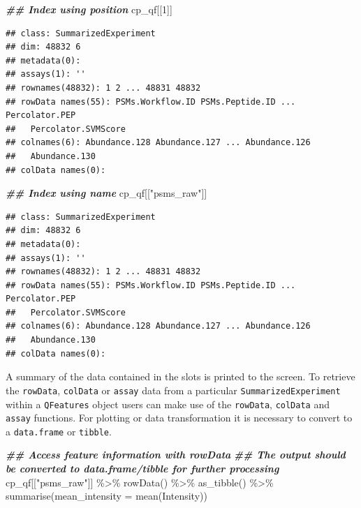 \documentclass[9pt,a4paper,]{extarticle}
\newenvironment{Shaded}{\begin{snugshade}}{\end{snugshade}}
\newcommand{\AttributeTok}[1]{\textcolor[rgb]{0.77,0.63,0.00}{#1}}
\newcommand{\DecValTok}[1]{\textcolor[rgb]{0.00,0.00,0.81}{#1}}
\newcommand{\DocumentationTok}[1]{\textcolor[rgb]{0.56,0.35,0.01}{\textbf{\textit{#1}}}}
\newcommand{\FunctionTok}[1]{\textcolor[rgb]{0.00,0.00,0.00}{#1}}
\newcommand{\NormalTok}[1]{#1}
\newcommand{\SpecialCharTok}[1]{\textcolor[rgb]{0.00,0.00,0.00}{#1}}
\newcommand{\StringTok}[1]{\textcolor[rgb]{0.31,0.60,0.02}{#1}}
\begin{document}
\begin{Shaded}
\begin{Highlighting}[]
\DocumentationTok{\#\# Index using position}
\NormalTok{cp\_qf[[}\DecValTok{1}\NormalTok{]]}
\end{Highlighting}
\end{Shaded}

\begin{verbatim}
## class: SummarizedExperiment 
## dim: 48832 6 
## metadata(0):
## assays(1): ''
## rownames(48832): 1 2 ... 48831 48832
## rowData names(55): PSMs.Workflow.ID PSMs.Peptide.ID ... Percolator.PEP
##   Percolator.SVMScore
## colnames(6): Abundance.128 Abundance.127 ... Abundance.126
##   Abundance.130
## colData names(0):
\end{verbatim}

\begin{Shaded}
\begin{Highlighting}[]
\DocumentationTok{\#\# Index using name}
\NormalTok{cp\_qf[[}\StringTok{"psms\_raw"}\NormalTok{]]}
\end{Highlighting}
\end{Shaded}

\begin{verbatim}
## class: SummarizedExperiment 
## dim: 48832 6 
## metadata(0):
## assays(1): ''
## rownames(48832): 1 2 ... 48831 48832
## rowData names(55): PSMs.Workflow.ID PSMs.Peptide.ID ... Percolator.PEP
##   Percolator.SVMScore
## colnames(6): Abundance.128 Abundance.127 ... Abundance.126
##   Abundance.130
## colData names(0):
\end{verbatim}

A summary of the data contained in the slots is printed to the screen.
To retrieve the \texttt{rowData}, \texttt{colData} or \texttt{assay} data from a particular
\texttt{SummarizedExperiment} within a \texttt{QFeatures} object users can make use of the
\texttt{rowData}, \texttt{colData} and \texttt{assay} functions. For plotting or data transformation
it is necessary to convert to a \texttt{data.frame} or \texttt{tibble}.

\begin{Shaded}
\begin{Highlighting}[]
\DocumentationTok{\#\# Access feature information with rowData}
\DocumentationTok{\#\# The output should be converted to data.frame/tibble for further processing}
\NormalTok{cp\_qf[[}\StringTok{"psms\_raw"}\NormalTok{]] }\SpecialCharTok{\%\textgreater{}\%} 
  \FunctionTok{rowData}\NormalTok{() }\SpecialCharTok{\%\textgreater{}\%} 
  \FunctionTok{as\_tibble}\NormalTok{() }\SpecialCharTok{\%\textgreater{}\%} 
  \FunctionTok{summarise}\NormalTok{(}\AttributeTok{mean\_intensity =} \FunctionTok{mean}\NormalTok{(Intensity))}
\end{Highlighting}
\end{Shaded}
\end{document}
